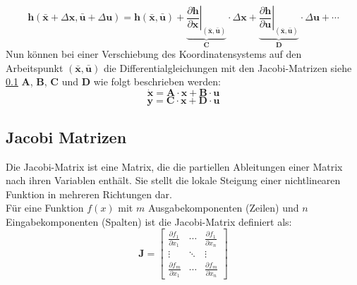 \begin{equation} 
\mathbf{h}(\bar{\mathbf{x}} + \Delta \mathbf{x}, \bar{\mathbf{u}} + \Delta \mathbf{u}) = \mathbf{h}(\bar{\mathbf{x}}, \bar{\mathbf{u}}) + \underbrace{\left. \frac{\partial \mathbf{h}}{\partial \mathbf{x}} \right|_{(\bar{\mathbf{x}}, \bar{\mathbf{u}})}}_{\mathbf{C}} \cdot \Delta \mathbf{x} + \underbrace{\left. \frac{\partial \mathbf{h}}{\partial \mathbf{u}} \right|_{(\bar{\mathbf{x}}, \bar{\mathbf{u}})}}_{\mathbf{D}} \cdot \Delta \mathbf{u} + \cdots
\end{equation}
Nun können bei einer Verschiebung des Koordinatensystems auf den Arbeitspunkt $(\bar{\mathbf{x}}, \bar{\mathbf{u}})$ die Differentialgleichungen mit den Jacobi-Matrizen siehe \ref{subsec:jacobi_matrizen} $\mathbf{A}$, $\mathbf{B}$, $\mathbf{C}$ und $\mathbf{D}$ wie folgt beschrieben werden:
\begin{equation}
  \dot{\mathbf{x}} = \mathbf{A} \cdot  \mathbf{x} + \mathbf{B} \cdot  \mathbf{u}
\end{equation}
\begin{equation}
     \mathbf{y} = \mathbf{C} \cdot  \mathbf{x} + \mathbf{D} \cdot  \mathbf{u} 
\end{equation}
\subsection{Jacobi Matrizen}
\label{subsec:jacobi_matrizen}
Die Jacobi-Matrix ist eine Matrix, die die partiellen Ableitungen einer Matrix nach ihren Variablen enthält. Sie stellt die lokale Steigung einer nichtlinearen Funktion in mehreren Richtungen dar.
\\
Für eine Funktion ${f}({x})$ mit $m$ Ausgabekomponenten (Zeilen) und $n$ Eingabekomponenten (Spalten) ist die Jacobi-Matrix definiert als:
\begin{equation}
    \mathbf{J} = \begin{bmatrix}
    \frac{\partial f_1}{\partial x_1}  & \cdots & \frac{\partial f_1}{\partial x_n} \\
    
    \vdots  & \ddots & \vdots \\
    \frac{\partial f_m}{\partial x_1} &  \cdots & \frac{\partial f_m}{\partial x_n}
    \end{bmatrix}
\end{equation}


